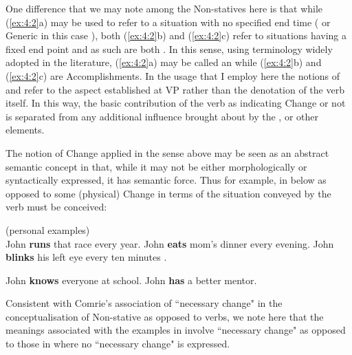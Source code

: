 One difference that we may note among the Non-statives here is that
while (\ref{ex:4:2}a) may be used to refer to a situation with no
specified end time ( or Generic in this case ), 
both (\ref{ex:4:2}b) and (\ref{ex:4:2}c) refer to situations having a fixed end point and as such are
both .  In this sense, using  terminology
widely adopted in the literature, (\ref{ex:4:2}a) may be called an
 while (\ref{ex:4:2}b) and (\ref{ex:4:2}c) are
Accomplishments.  In the usage that I employ here the notions of
 and  refer to the aspect established at VP
rather than the denotation of the verb itself.  In this way, the basic
contribution of the verb as indicating Change or not is separated from
any additional influence brought about by the ,
 or other elements.

The notion of Change applied in the sense above may be seen as an
abstract semantic concept in that, while it may not be either
morphologically or syntactically expressed, it has semantic force.
Thus for example, in  below as opposed to 
some (physical) Change in terms of the situation conveyed by the verb
must be conceived:

\ea%
\label{ex:4:3}

(personal examples)\\
\ea John \textbf{runs} that race every year.
\ex John \textbf{eats} mom’s dinner every evening. 
\ex John \textbf{blinks} his left eye every ten minutes .\z \z


\ea%
\label{ex:4:4}
\ea John \textbf{knows} everyone at school. 
\ex John \textbf{has} a better mentor. \z \z


Consistent with Comrie’s association of ``necessary change" in the
conceptualisation of Non-stative as opposed to  verbs, we note
here that the meanings associated with the examples in 
involve ``necessary change" as opposed to those in  where
no ``necessary change" is expressed.

